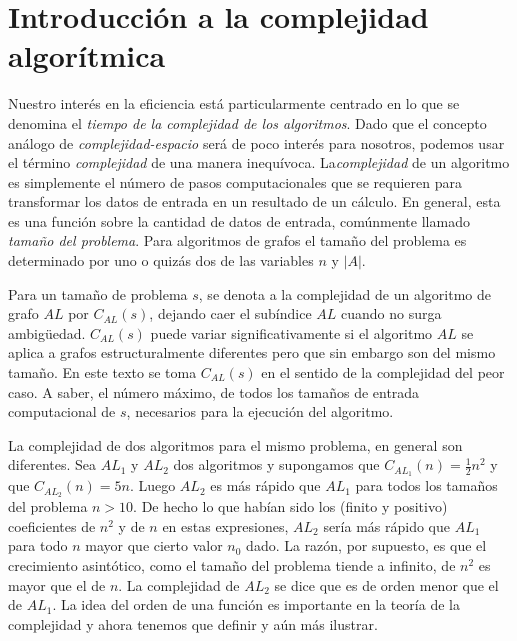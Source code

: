 \documentclass[10pt,a5paper]{book}
\begin{document}
\section[Intro. complejidad algorítmica]{Introducción a la complejidad algorítmica}

Nuestro interés en la eficiencia está particularmente centrado en lo que se denomina el \emph{tiempo de la complejidad de los algoritmos}. Dado que el concepto análogo de \emph{complejidad-espacio} será de poco interés para nosotros, podemos usar el término \emph{complejidad} de una manera inequívoca. La\emph{complejidad} de un algoritmo es simplemente el número de pasos computacionales que se requieren para transformar los datos de entrada en un resultado de un cálculo. En general, esta es una función sobre la cantidad de datos de entrada, comúnmente llamado \emph{tamaño del problema}. Para algoritmos de grafos el tamaño del problema es determinado por uno o quizás dos de las variables $n$ y $|A|$.

Para un tamaño de problema $s$, se denota a la complejidad de un algoritmo de grafo $AL$ por $C_{AL}(s)$, dejando caer el subíndice $AL$ cuando no surga ambigüedad. $C_{AL}(s)$ puede variar significativamente si el algoritmo $AL$ se aplica a grafos estructuralmente diferentes pero que sin embargo son del mismo tamaño. En este texto se toma $C_{AL}(s)$ en el sentido de la complejidad del peor caso. A saber, el número máximo, de todos los tamaños de entrada computacional de $s$, necesarios para la ejecución del algoritmo.

La complejidad de dos algoritmos para el mismo problema, en general son diferentes. Sea $AL_1$ y $AL_2$ dos algoritmos y supongamos que $C_{AL_{1}}(n) = \frac{1}{2}n^2$ y que $C_{AL_{2}}(n) = 5n$. Luego $AL_2$ es más rápido que $AL_1$ para todos los tamaños del problema $n>10$. De hecho lo que habían sido los (finito y positivo) coeficientes de $n^2$ y de $n$ en estas expresiones, $AL_2$ sería más rápido que $AL_1$ para todo $n$ mayor que cierto valor $n_0$ dado. La razón, por supuesto, es que el crecimiento asintótico, como el tamaño del problema tiende a infinito, de $n^2$ es mayor que el de $n$. La complejidad de $AL_2$ se dice que es de orden menor que el de $AL_1$. La idea del orden de una función es importante en la teoría de la complejidad y ahora tenemos que definir y aún más ilustrar.
\end{document}
